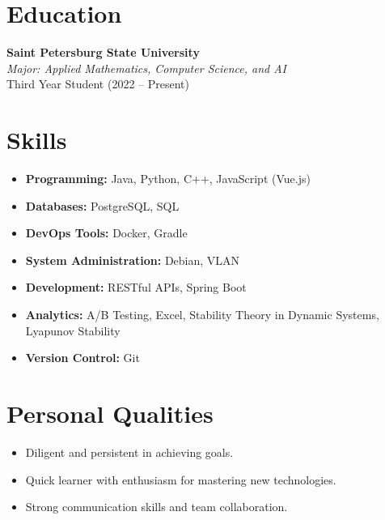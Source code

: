 \documentclass[a4paper,10pt]{article}
\begin{document}
\vspace{0.5cm}

\section*{Education}

\textbf{Saint Petersburg State University} \\
\textit{Major: Applied Mathematics, Computer Science, and AI} \\
Third Year Student (2022 – Present)

\vspace{0.5cm}

\section*{Skills}

\begin{itemize}
    \item \textbf{Programming:} Java, Python, C++, JavaScript (Vue.js)
    \item \textbf{Databases:} PostgreSQL, SQL
    \item \textbf{DevOps Tools:} Docker, Gradle
    \item \textbf{System Administration:} Debian, VLAN
    \item \textbf{Development:} RESTful APIs, Spring Boot
    \item \textbf{Analytics:} A/B Testing, Excel, Stability Theory in Dynamic Systems, Lyapunov Stability
    \item \textbf{Version Control:} Git
\end{itemize}

\vspace{0.5cm}

\section*{Personal Qualities}

\begin{itemize}
    \item Diligent and persistent in achieving goals.
    \item Quick learner with enthusiasm for mastering new technologies.
    \item Strong communication skills and team collaboration.
\end{itemize}
\end{document}
